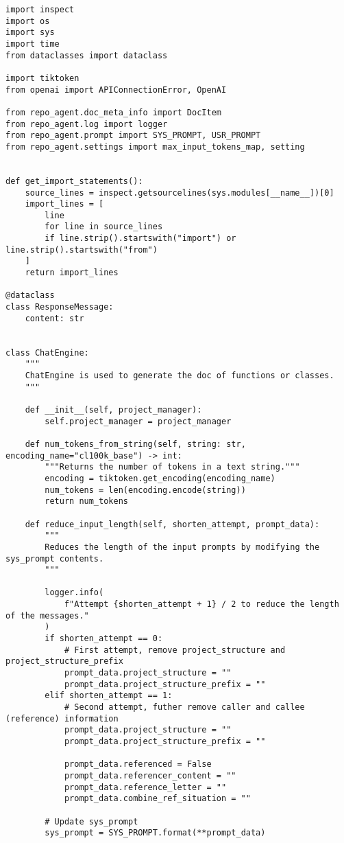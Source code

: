 \begin{verbatim}
import inspect
import os
import sys
import time
from dataclasses import dataclass

import tiktoken
from openai import APIConnectionError, OpenAI

from repo_agent.doc_meta_info import DocItem
from repo_agent.log import logger
from repo_agent.prompt import SYS_PROMPT, USR_PROMPT
from repo_agent.settings import max_input_tokens_map, setting


def get_import_statements():
    source_lines = inspect.getsourcelines(sys.modules[__name__])[0]
    import_lines = [
        line
        for line in source_lines
        if line.strip().startswith("import") or line.strip().startswith("from")
    ]
    return import_lines

@dataclass
class ResponseMessage:
    content: str


class ChatEngine:
    """
    ChatEngine is used to generate the doc of functions or classes.
    """

    def __init__(self, project_manager):
        self.project_manager = project_manager

    def num_tokens_from_string(self, string: str, encoding_name="cl100k_base") -> int:
        """Returns the number of tokens in a text string."""
        encoding = tiktoken.get_encoding(encoding_name)
        num_tokens = len(encoding.encode(string))
        return num_tokens

    def reduce_input_length(self, shorten_attempt, prompt_data):
        """
        Reduces the length of the input prompts by modifying the sys_prompt contents.
        """

        logger.info(
            f"Attempt {shorten_attempt + 1} / 2 to reduce the length of the messages."
        )
        if shorten_attempt == 0:
            # First attempt, remove project_structure and project_structure_prefix
            prompt_data.project_structure = ""
            prompt_data.project_structure_prefix = ""
        elif shorten_attempt == 1:
            # Second attempt, futher remove caller and callee (reference) information
            prompt_data.project_structure = ""
            prompt_data.project_structure_prefix = ""

            prompt_data.referenced = False
            prompt_data.referencer_content = ""
            prompt_data.reference_letter = ""
            prompt_data.combine_ref_situation = ""

        # Update sys_prompt
        sys_prompt = SYS_PROMPT.format(**prompt_data)


\end{verbatim}

